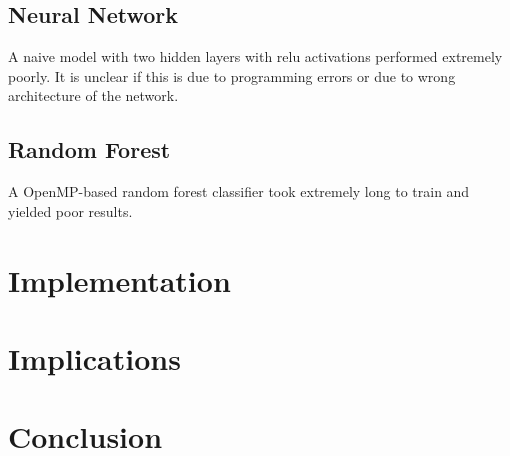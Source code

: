 \documentclass{article}
\begin{document}
\subsection{Neural Network}
A naive model with two hidden layers with relu activations performed extremely poorly.
It is unclear if this is due to programming errors or due to wrong architecture of the network.


\subsection{Random Forest}
A OpenMP-based random forest classifier took extremely long to train and yielded poor results.


\section{Implementation}



\section{Implications}


\section{Conclusion}


%
\printbibliography
\end{document}
